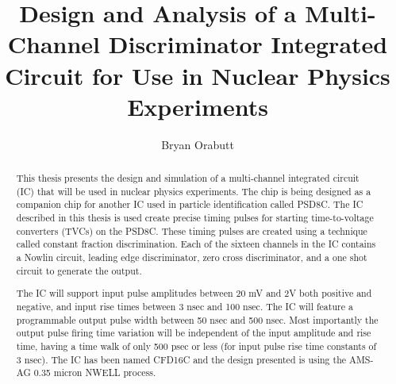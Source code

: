 \documentclass[12pt,oneside,final]{siuethesis}
\author{Bryan Orabutt}
\title{Design and Analysis of a Multi-Channel Discriminator Integrated Circuit for Use in Nuclear Physics Experiments}
\theoremstyle{definition}
\begin{document}
\maketitle 

\frontmatter %

\copyrightpage %



\begin{abstract}

\par This thesis presents the design and simulation of a multi-channel integrated circuit (IC) that will be used in nuclear physics experiments. The chip is being designed as a companion chip for another IC used in particle identification called PSD8C. The IC described in this thesis is used create precise timing pulses for starting time-to-voltage converters (TVCs) on the PSD8C. These timing pulses are created using a technique called constant fraction discrimination. Each of the sixteen channels in the IC contains a Nowlin circuit, leading edge discriminator, zero cross discriminator, and a one shot circuit to generate the output. \par The IC will support input pulse amplitudes between 20 mV and 2V both positive and negative, and input rise times between 3 nsec and 100 nsec. The IC will feature a programmable output pulse width between 50 nsec and 500 nsec. Most importantly the output pulse firing time variation will be independent of the input amplitude and rise time, having a time walk of only 500 psec or less (for input pulse rise time constants of 3 nsec). The IC has been named CFD16C and the design presented is using the AMS-AG 0.35 micron NWELL process.
\end{abstract}


\end{document}
